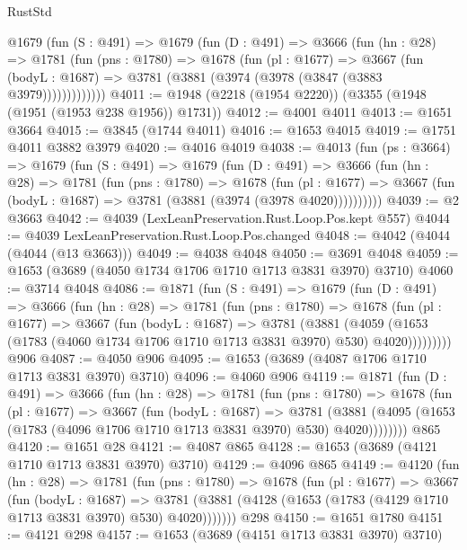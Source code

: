 \begin{lexlean}{RustStd}
\begin{coremodule}
      @1679
        (fun (S : @491) =>
        @1679
          (fun (D : @491) =>
          @3666
            (fun (hn : @28) =>
            @1781
              (fun (pns : @1780) =>
              @1678
                (fun (pl : @1677) =>
                @3667
                  (fun (bodyL : @1687) =>
                  @3781 (@3881 (@3974 (@3978 (@3847 (@3883 @3979)))))))))))))
@4011 := @1948 (@2218 (@1954 @2220)) (@3355 (@1948 (@1951 (@1953 @238 @1956)) @1731))
@4012 := @4001 @4011
@4013 := @1651 @3664
@4015 := @3845 (@1744 @4011)
@4016 := @1653 @4015
@4019 := @1751 @4011 @3882 @3979
@4020 := @4016 @4019
@4038 := @4013
    (fun (ps : @3664) =>
    @1679
      (fun (S : @491) =>
      @1679
        (fun (D : @491) =>
        @3666
          (fun (hn : @28) =>
          @1781
            (fun (pns : @1780) =>
            @1678
              (fun (pl : @1677) =>
              @3667 (fun (bodyL : @1687) => @3781 (@3881 (@3974 (@3978 @4020))))))))))
@4039 := @2 @3663
@4042 := @4039 (LexLeanPreservation.Rust.Loop.Pos.kept @557)
@4044 := @4039 LexLeanPreservation.Rust.Loop.Pos.changed
@4048 := @4042 (@4044 (@4044 (@13 @3663)))
@4049 := @4038 @4048
@4050 := @3691 @4048
@4059 := @1653 (@3689 (@4050 @1734 @1706 @1710 @1713 @3831 @3970) @3710)
@4060 := @3714 @4048
@4086 := @1871
    (fun (S : @491) =>
    @1679
      (fun (D : @491) =>
      @3666
        (fun (hn : @28) =>
        @1781
          (fun (pns : @1780) =>
          @1678
            (fun (pl : @1677) =>
            @3667
              (fun (bodyL : @1687) =>
              @3781
                (@3881
                  (@4059
                    (@1653 (@1783 (@4060 @1734 @1706 @1710 @1713 @3831 @3970) @530) @4020)))))))))
    @906
@4087 := @4050 @906
@4095 := @1653 (@3689 (@4087 @1706 @1710 @1713 @3831 @3970) @3710)
@4096 := @4060 @906
@4119 := @1871
    (fun (D : @491) =>
    @3666
      (fun (hn : @28) =>
      @1781
        (fun (pns : @1780) =>
        @1678
          (fun (pl : @1677) =>
          @3667
            (fun (bodyL : @1687) =>
            @3781
              (@3881 (@4095 (@1653 (@1783 (@4096 @1706 @1710 @1713 @3831 @3970) @530) @4020))))))))
    @865
@4120 := @1651 @28
@4121 := @4087 @865
@4128 := @1653 (@3689 (@4121 @1710 @1713 @3831 @3970) @3710)
@4129 := @4096 @865
@4149 := @4120
    (fun (hn : @28) =>
    @1781
      (fun (pns : @1780) =>
      @1678
        (fun (pl : @1677) =>
        @3667
          (fun (bodyL : @1687) =>
          @3781 (@3881 (@4128 (@1653 (@1783 (@4129 @1710 @1713 @3831 @3970) @530) @4020)))))))
    @298
@4150 := @1651 @1780
@4151 := @4121 @298
@4157 := @1653 (@3689 (@4151 @1713 @3831 @3970) @3710)

\end{coremodule}
\end{lexlean}
